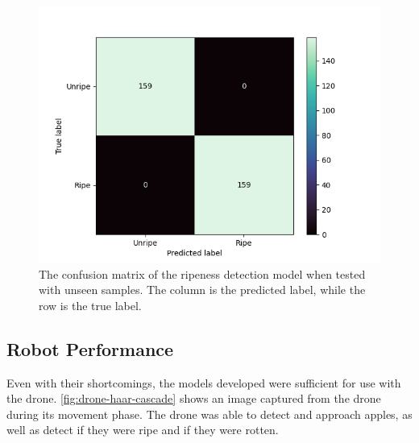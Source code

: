 \begin{figure}[htb]
    \centering
    \includegraphics[width=\columnwidth,keepaspectratio]
    {./figures/ripeness_confusion}
    \caption{
        The confusion matrix of the ripeness detection model when tested with unseen
        samples.
        The column is the predicted label, while the row is the true label.
    }
    \label{fig:ripeness-confusion-matrix}
\end{figure}

\subsection{Robot Performance}\label{subsec:robot-performance}
Even with their shortcomings, the models developed were sufficient for use with the
drone.
\autoref{fig:drone-haar-cascade} shows an image captured from the drone during its
movement phase.
The drone was able to detect and approach apples, as well as detect if they were ripe
and if they were rotten.

